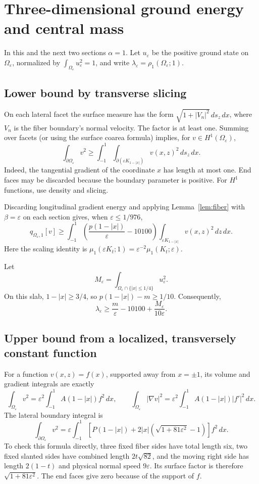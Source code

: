 \documentclass[11pt,a4paper]{article}
\theoremstyle{remark}
\newcommand{\eps}{\varepsilon}
\begin{document}
\section{Three-dimensional ground energy and central mass}
In this and the next two sections $\alpha=1$. Let $u_\eps$ be the positive ground state on $\Omega_\eps$, normalized by $\int_{\Omega_\eps}u_\eps^2=1$, and write $\lambda_\eps=\rho_1(\Omega_\eps;1)$.

\subsection{Lower bound by transverse slicing}
On each lateral facet the surface measure has the form $\sqrt{1+|V_n|^2}\,ds_z\,dx$, where $V_n$ is the fiber boundary's normal velocity. The factor is at least one. Summing over facets (or using the surface coarea formula) implies, for $v\in H^1(\Omega_\eps)$,
\[
 \int_{\partial\Omega_\eps}v^2
 \ge\int_{-1}^1\int_{\partial(\eps K_{1-|x|})}v(x,z)^2\,ds_z\,dx.
\]
Indeed, the tangential gradient of the coordinate $x$ has length at most one. End faces may be discarded because the boundary parameter is positive. For $H^1$ functions, use density and slicing.

Discarding longitudinal gradient energy and applying Lemma~\ref{lem:fiber} with $\beta=\eps$ on each section gives, when $\eps\le1/976$,
\begin{equation}\label{eq:full-lower}
 q_{\Omega_\eps,1}[v]\ge
 \int_{-1}^1\left(\frac{p(1-|x|)}{\eps}-10100\right)
 \int_{\eps K_{1-|x|}}v(x,z)^2\,dz\,dx.
\end{equation}
Here the scaling identity is
$\mu_1(\eps K_t;1)=\eps^{-2}\mu_1(K_t;\eps)$.

Let
\[
 M_\eps=\int_{\Omega_\eps\cap\{|x|\le1/4\}}u_\eps^2.
\]
On this slab, $1-|x|\ge3/4$, so $p(1-|x|)-m\ge1/10$. Consequently,
\begin{equation}\label{eq:mass-lower}
 \lambda_\eps\ge\frac m\eps-10100+\frac{M_\eps}{10\eps}.
\end{equation}

\subsection{Upper bound from a localized, transversely constant function}
For a function $v(x,z)=f(x)$, supported away from $x=\pm1$, its volume and gradient integrals are exactly
\[
 \int_{\Omega_\eps}v^2=\eps^2\int_{-1}^1 A(1-|x|)f^2\,dx,\qquad
 \int_{\Omega_\eps}|\nabla v|^2=\eps^2\int_{-1}^1 A(1-|x|)|f'|^2\,dx.
\]
The lateral boundary integral is
\begin{equation}\label{eq:lateral}
 \int_{\partial\Omega_\eps}v^2
 =\eps\int_{-1}^1\left[P(1-|x|)
 +2|x|\left(\sqrt{1+81\eps^2}-1\right)\right]f^2\,dx.
\end{equation}
To check this formula directly, three fixed fiber sides have total length six, two fixed slanted sides have combined length $2t\sqrt{82}$, and the moving right side has length $2(1-t)$ and physical normal speed $9\eps$. Its surface factor is therefore $\sqrt{1+81\eps^2}$. The end faces give zero because of the support of $f$.
\end{document}
